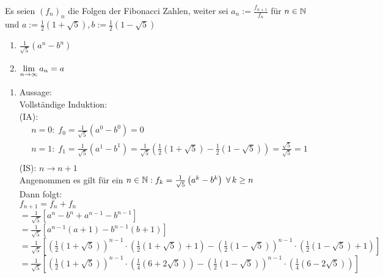 \documentclass[../ana1u.tex]{subfiles}
\begin{document}
\begin{bsp}
    Es seien \((f_n)_n\) die Folgen der Fibonacci Zahlen, weiter sei \(a_n := \frac{f_{n+1}}{f_n}\) für \(n \in \mathbb{N}\) und \(a := \frac{1}{2}(1 + \sqrt{5}), b := \frac{1}{2}(1 - \sqrt{5})\)\\
    \begin{enumerate}
        \item \(\frac{1}{\sqrt{5}}\left(a^n-b^n\right)\)
        \item \(\lim\limits_{n\rightarrow\infty} a_n = a\)
    \end{enumerate}
    \begin{bew}
        \begin{enumerate}
            \item Aussage:\\
                Vollständige Induktion:\\
                (IA):
                \begin{align*}
                    &n = 0: \; f_0 = \frac{1}{\sqrt{5}} \left(a^0-b^0 \right) = 0\\		
                    &n = 1: \; f_1 = \frac{1}{\sqrt{5}} \left(a^1-b^1 \right) = \frac{1}{\sqrt{5}} \left(\frac{1}{2}(1 + \sqrt{5})-\frac{1}{2}(1 - \sqrt{5}) \right) = \frac{\sqrt{5}}{\sqrt{5}} = 1\\		
                \end{align*}
                (IS): \(n \rightarrow n+1\)\\
                Angenommen es gilt für ein \(n \in \mathbb{N}: f_k = \frac{1}{\sqrt{5}}\left(a^k-b^k\right) \; \forall \, k \geq n\)\\
                Dann folgt:\\
                \(f_{n+1} = f_n + f_n\)\\
                \(= \frac{1}{\sqrt{5}}\left[a^n - b^n +a^{n-1} - b^{n-1}\right]\)\\
                \(= \frac{1}{\sqrt{5}}\left[a^{n-1}(a+1) - b^{n-1}(b+1)\right]\)\\
                \(= \frac{1}{\sqrt{5}}\left[\left(\frac{1}{2}\left(1 + \sqrt{5}\right)\right)^{n-1} \cdot\left(\frac{1}{2}\left(1 + \sqrt{5}\right)+1\right) - \left(\frac{1}{2}\left(1 - \sqrt{5}\right)\right)^{n-1}\cdot\left(\frac{1}{2}\left(1 - \sqrt{5}\right)+1\right)\right]\)\\
                \(= \frac{1}{\sqrt{5}}\left[\left(\frac{1}{2}\left(1 + \sqrt{5}\right)\right)^{n-1}\cdot\left(\frac{1}{4}\left(6 + 2\sqrt{5}\right)\right) - \left(\frac{1}{2}\left(1 - \sqrt{5}\right)\right)^{n-1}\cdot\left(\frac{1}{4}\left(6 - 2\sqrt{5}\right)\right)\right]\)\\

\end{enumerate}
\end{bew}
\end{bsp}
\end{document}
